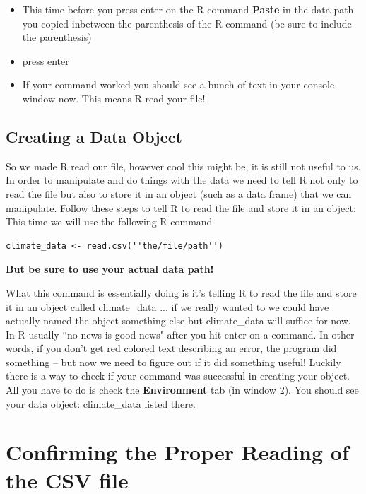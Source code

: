\documentclass{article}\usepackage[]{graphicx}\usepackage[]{color}
\begin{document}
\begin{itemize}
\item This time before you press enter on the R command \textbf{Paste} in the data path you copied inbetween the parenthesis of the R command (be sure to include the parenthesis)
\item press enter
\item If your command worked you should see a bunch of text in your console window now. This means R read your file!
\end{itemize}

\subsection{Creating a Data Object}
So we made R read our file, however cool this might be, it is still not useful to us. In order to manipulate and do things with the data we need to tell R not only to read the file but also to store it in an object (such as a data frame) that we can manipulate. Follow these steps to tell R to read the file and store it in an object: \\

This time we will use the following R command\\
\begin{verbatim}
climate_data <- read.csv(''the/file/path'')
\end{verbatim}

\textbf{But be sure to use your actual data path!}

What this command is essentially doing is it's telling R to read the file and store it in an object called climate\_data ... if we really wanted to we could have actually named the object something else but climate\_data will suffice for now. \\ 

In R usually ``no news is good news" after you hit enter on a command. In other words, if you don't get red colored text describing an error, the program did something -- but now we need to figure out if it did something useful! Luckily there is a way to check if your command was successful in creating your object. All you have to do is check the \textbf{Environment} tab (in window 2). You should see your data object: climate\_data listed there. 


\section{Confirming the Proper Reading of the CSV file}
\end{document}
